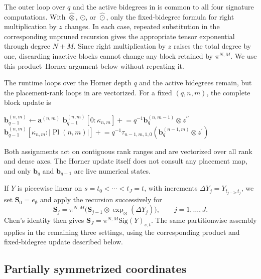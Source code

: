 \documentclass{amsart}
\theoremstyle{definition}
\theoremstyle{remark}
\newcommand{\Sig}[1]{\mathrm{Sig}(#1)}
\begin{document}
The outer loop over $q$ and the active bidegrees in
 is common to all four signature
computations. With $\widehat{\otimes}$, $\odot$, or
$\widehat{\odot}$, only the fixed-bidegree formula for right multiplication
by $z$ changes. In each case, repeated substitution in the corresponding
unpruned recursion gives the appropriate tensor exponential through degree
$N+M$. Since right multiplication by $z$ raises the total degree by one,
discarding inactive blocks cannot change any block retained by
$\pi^{N,M}$. We use this product--Horner argument below without repeating
it.

\begin{implrmk}
The runtime loops over the Horner depth $q$ and the active bidegrees remain,
but the placement-rank loops in
 are vectorized. For a fixed
$(q,n,m)$, the complete block update is
\begin{algorithmic}[1]
\State $\mathbf{b}_{q-1}^{(n,m)}
    \gets\mathbf{a}^{(n,m)}$
    \State $\mathbf{b}_{q-1}^{(n,m)}
        [0:\kappa_{n,m}]
        \mathrel{+}=
        q^{-1}\mathbf{b}_{q}^{(n,m-1)}
        \otimes z^{\prime\prime}$
\EndIf
{}
    \State $\mathbf{b}_{q-1}^{(n,m)}
        [\kappa_{n,m}:|\operatorname{Pl}(n,m)|]
        \mathrel{+}=
        q^{-1}\tau_{n-1,m,1,0}
        \left(
            \mathbf{b}_{q}^{(n-1,m)}
            \otimes z^{\prime}
        \right)$
\EndIf
\end{algorithmic}
Both assignments act on contiguous rank ranges and are vectorized over all
rank and dense axes. The Horner update itself does not consult any placement
map, and only $\mathbf{b}_{q}$ and $\mathbf{b}_{q-1}$ are live numerical
states.
\end{implrmk}

If $Y$ is piecewise linear on
$s=t_0<\cdots<t_J=t$, with increments
$\Delta Y_j=Y_{t_{j-1},t_j}$, we set
$\mathbf{S}_0=e_{\emptyset}$ and apply the recursion successively for
\[
    \mathbf{S}_j
    =
    \pi^{N,M}
    \bigl(
        \mathbf{S}_{j-1}
        \otimes
        \exp_{\otimes}(\Delta Y_j)
    \bigr),
    \qquad
    j=1,\ldots,J.
\]
Chen's identity then gives
$\mathbf{S}_J
    =
    \pi^{N,M}\Sig{Y}_{s,t}$.
The same partitionwise assembly applies in the remaining three settings,
using the corresponding product and fixed-bidegree update described below.

\subsection{Partially symmetrized coordinates}
\end{document}
